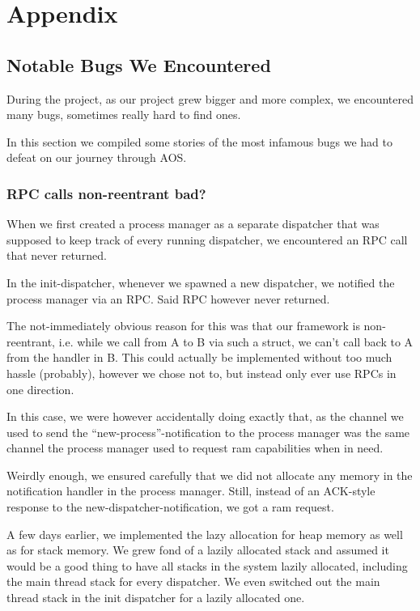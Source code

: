 

\newpage
\section{Appendix}\label{appendix}
\subsection{Notable Bugs We Encountered}
During the project, as our project grew bigger and more complex, we encountered many bugs, sometimes
really hard to find ones.

In this section we compiled some stories of the most infamous bugs we had to defeat on our journey through AOS.

\subsubsection{RPC calls non-reentrant bad?}
When we first created a process manager as a separate dispatcher that was supposed to keep track of every
running dispatcher, we encountered an RPC call that never returned.

In the init-dispatcher, whenever we spawned a new dispatcher, we notified the process manager via an RPC.
Said RPC however never returned.


The not-immediately obvious reason for this was that our  framework is non-reentrant, i.e.
while we call from A to B via such a struct, we can't call back to A from the handler in B. This could actually be
implemented without too much hassle (probably), however we chose not to, but instead only ever use RPCs in one direction.

In this case, we were however accidentally doing exactly that, as the channel we used to send the
``new-process''-notification to the process manager was the same channel the process manager used to request
ram capabilities when in need.

Weirdly enough, we ensured carefully that we did not allocate any memory in the notification handler in the process manager.
Still, instead of an ACK-style response to the new-dispatcher-notification, we got a ram request.

A few days earlier, we implemented the lazy allocation for heap memory as well as for stack memory.
We grew fond of a lazily allocated stack and assumed it would be a good thing to have all stacks in the
system lazily allocated, including the main thread stack for every dispatcher. We even switched out the
main thread stack in the init dispatcher for a lazily allocated one.

